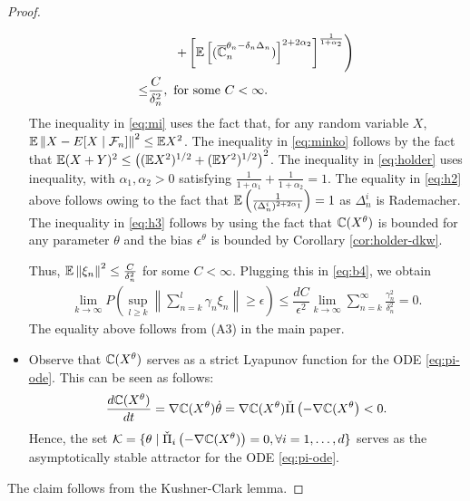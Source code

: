 \begin{proof}
\begin{itemize}
\begin{align}
&\left.\qquad  +
\left[\mathbb{E}\left[ (\overline {\mathbb{C}}_n^{\theta_n - \delta_n \Delta_n})\right]^{2+2\alpha_2}\right]^{\frac{1}{1+\alpha_2}}\right) \label{eq:h2}\\
\le & \frac{C}{\delta_n^2}, \text{ for some } C< \infty. \label{eq:h3}
\end{align}
The inequality in \eqref{eq:mi} uses the fact that, for any random variable $X$, $\mathbb{E}\left\|X -  E[X\mid\mathcal{F}_n]\right\|^2 \le \mathbb{E} X^2$. The inequality in \eqref{eq:minko} follows by the fact that $\mathbb{E} (X+Y)^2 \le \left( (\mathbb{E} X^2)^{1/2} + (\mathbb{E} Y^2)^{1/2}\right)^2$.
The inequality in \eqref{eq:holder} uses \holder inequality, with $\alpha_1, \alpha_2>0$ satisfying $\frac{1}{1+\alpha_1} + \frac{1}{1+\alpha_2}=1$. 
The equality in \eqref{eq:h2} above follows owing to the fact that $\mathbb{E}\left(\frac1{(\Delta_n^i)^{2+2\alpha_1}}\right)  = 1$ as $\Delta_n^i$ is Rademacher. 
The inequality in \eqref{eq:h3} follows by using the fact that
$\mathbb{C}(X^\theta)$ is bounded for any parameter $\theta$ and the bias $\epsilon^\theta$ is bounded by Corollary \ref{cor:holder-dkw}.

Thus, $\mathbb{E}\left\| \xi_n\right\|^2 \le \frac{C}{\delta_n^2}$ for some $C<\infty$. Plugging this in \eqref{eq:b4}, we obtain
\begin{align*}
 \lim_{k\rightarrow\infty} P\left( \sup_{l\geq k}   \left\|\sum_{n=k}^{l} \gamma_n \xi_n\right\|\geq \epsilon \right) \le \dfrac{d C}{\epsilon^2} \lim_{k\rightarrow\infty} \sum_{n=k}^{\infty}  \frac{\gamma_n^2}{\delta_n^2} =0.
\end{align*}
The equality above follows from (A3) in the main paper.
\item Observe that $\mathbb{C}(X^{\theta})$ serves as a strict Lyapunov function for the ODE \eqref{eq:pi-ode}. This can be seen as follows:
$$ \dfrac{d \mathbb{C}(X^{\theta})}{dt} = \nabla \mathbb{C}(X^{\theta}) \dot \theta = \nabla \mathbb{C}(X^{\theta}) \check\Pi \left(-\nabla \mathbb{C}(X^{\theta}\right) < 0.$$
Hence, the set $\mathcal{K} = \{\theta \mid \check\Pi_{i} \left(-\nabla \mathbb{C}(X^{\theta})\right)=0, \forall i=1,\ldots,d\}$ serves as the asymptotically stable attractor for the ODE \eqref{eq:pi-ode}.
\end{itemize} 
The claim follows from the Kushner-Clark lemma.
\end{proof}

